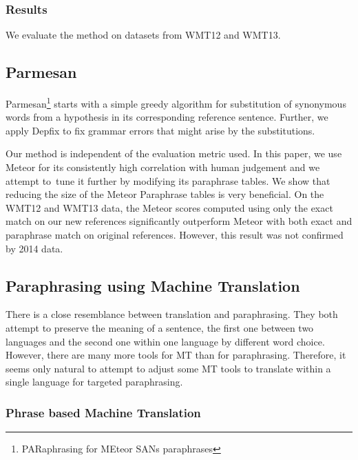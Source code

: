 \documentclass[11pt]{article}
\begin{document}
\subsubsection{Results}
We evaluate the method on datasets from WMT12 and WMT13.


\subsection{Parmesan}

Parmesan\footnote{PARaphrasing for MEteor SANs paraphrases} starts with a simple greedy algorithm for 
substitution of synonymous words from a hypothesis in its corresponding reference sentence. Further, 
we apply Depfix \cite{depfix} to fix grammar errors that might arise by the substitutions.

Our method is independent of the evaluation metric used. In this paper, we use Meteor for its consistently 
high correlation with human judgement and we attempt to~tune it further by modifying its paraphrase tables. 
We show that reducing the size of the Meteor Paraphrase tables is very beneficial. On the WMT12 and WMT13 data,
the Meteor scores computed using only the exact match on our new references significantly outperform Meteor 
with both exact and paraphrase match on original references. However, this result was not confirmed by 2014 
data. %



\subsection{Paraphrasing using Machine Translation}
There is a close resemblance between translation and paraphrasing. They both 
attempt to preserve the meaning of a sentence, the first one between two languages 
and the second one within one language by different word choice. \cite{madnani:2010} 
However, there are many more tools for MT than for paraphrasing. Therefore, it 
seems only natural to attempt to adjust some MT tools to translate within a 
single language for targeted paraphrasing. 

\subsubsection{Phrase based Machine Translation}
\end{document}
